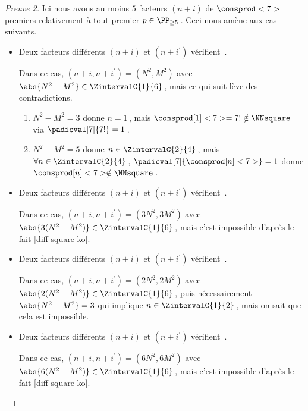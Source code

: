 \begin{proof}[Preuve 2]%
    Ici nous avons au moins $5$ facteurs $(n + i)$ de $\consprod<7>$ premiers relativement à tout premier $p \in \PP_{\geq 5}$\,. Ceci nous amène aux cas suivants.
    \begin{itemize}
    	\medskip
		\item Deux facteurs différents $(n+i)$ et $(n+i^\prime)$ vérifient \,.
		
		\smallskip
		\noindent
		Dans ce cas, $(n+i, n+i^\prime) = (N^2, M^2)$ avec $\abs{N^2 - M^2} \in \ZintervalC{1}{6}$\,, mais ce qui suit lève des contradictions.
		\begin{enumerate}
			\item $N^2 - M^2 = 3$ donne $n = 1$\,, mais $\consprod[1]<7> = 7! \notin \NNsquare$ via $\padicval[7]{7!} = 1$\,.


			\item $N^2 - M^2 = 5$ donne $n \in \ZintervalC{2}{4}$\,, mais $\forall n \in \ZintervalC{2}{4}$\,, $\padicval[7]{\consprod[n]<7>} = 1$ donne $\consprod[n]<7> \notin \NNsquare$\,.
		\end{enumerate}


    	\medskip
		\item Deux facteurs différents $(n+i)$ et $(n+i^\prime)$ vérifient \,.
		
		\smallskip
		\noindent
		Dans ce cas, $(n+i, n+i^\prime) = (3 N^2, 3 M^2)$ avec $\abs{3(N^2 - M^2)} \in \ZintervalC{1}{6}$\,, mais c'est impossible d'après le fait \ref{diff-square-ko}.

    	\medskip
		\item Deux facteurs différents $(n+i)$ et $(n+i^\prime)$ vérifient \,.
		
		\smallskip
		\noindent
		Dans ce cas, $(n+i, n+i^\prime) = (2 N^2, 2 M^2)$ avec $\abs{2(N^2 - M^2)} \in \ZintervalC{1}{6}$\,, puis nécessairement $\abs{N^2 - M^2} = 3$ qui implique $n \in \ZintervalC{1}{2}$\,, mais on sait que cela est impossible.


    	\medskip
		\item Deux facteurs différents $(n+i)$ et $(n+i^\prime)$ vérifient \,.
		
		\smallskip
		\noindent
		Dans ce cas, $(n+i, n+i^\prime) = (6 N^2, 6 M^2)$ avec $\abs{6(N^2 - M^2)} \in \ZintervalC{1}{6}$\,, mais c'est impossible d'après le fait \ref{diff-square-ko}.
		\qedhere
    \end{itemize}
\end{proof}

 